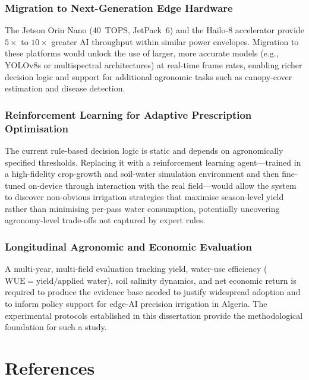 \documentclass[12pt,a4paper]{report}
\begin{document}
\subsection{Migration to Next-Generation Edge Hardware}
The Jetson Orin Nano (40~TOPS, JetPack~6) and the Hailo-8 accelerator provide $5\times$ to $10\times$ greater AI throughput within similar power envelopes. Migration to these platforms would unlock the use of larger, more accurate models (e.g., YOLOv8s or multispectral architectures) at real-time frame rates, enabling richer decision logic and support for additional agronomic tasks such as canopy-cover estimation and disease detection.

\subsection{Reinforcement Learning for Adaptive Prescription Optimisation}
The current rule-based decision logic is static and depends on agronomically specified thresholds. Replacing it with a reinforcement learning agent---trained in a high-fidelity crop-growth and soil-water simulation environment and then fine-tuned on-device through interaction with the real field---would allow the system to discover non-obvious irrigation strategies that maximise season-level yield rather than minimising per-pass water consumption, potentially uncovering agronomy-level trade-offs not captured by expert rules.

\subsection{Longitudinal Agronomic and Economic Evaluation}
A multi-year, multi-field evaluation tracking yield, water-use efficiency ($\text{WUE} = \text{yield} / \text{applied water}$), soil salinity dynamics, and net economic return is required to produce the evidence base needed to justify widespread adoption and to inform policy support for edge-AI precision irrigation in Algeria. The experimental protocols established in this dissertation provide the methodological foundation for such a study.

\chapter*{References}
\end{document}
